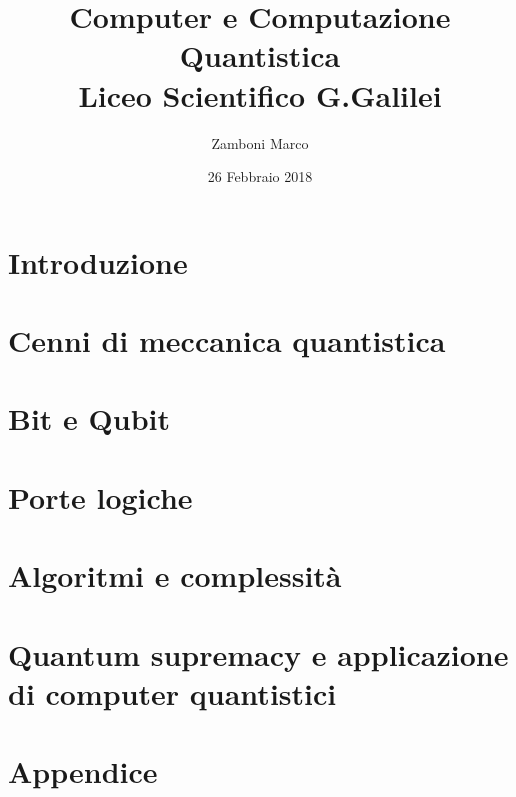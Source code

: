 \documentclass[10pt,twoside]{report}
\author{Zamboni Marco}
\date{26 Febbraio 2018}
\title{{Computer e Computazione Quantistica}\\
		{\large Liceo Scientifico G.Galilei}}
\begin{document}

\tableofcontents
\chapter{Introduzione}

\chapter{Cenni di meccanica quantistica}

\chapter{Bit e Qubit}

\chapter{Porte logiche}

\chapter{Algoritmi e complessità}

\chapter{Quantum supremacy e applicazione di computer quantistici}

\appendix
\chapter{Appendice}

\end{document}
